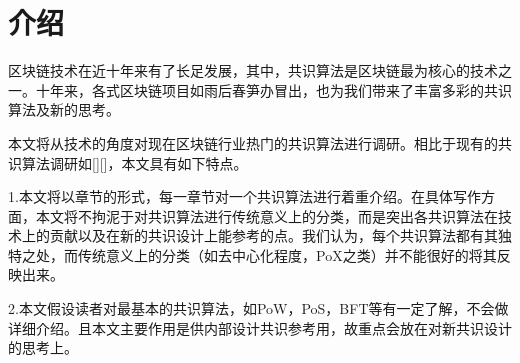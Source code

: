 \section{介绍}
区块链技术在近十年来有了长足发展，其中，共识算法是区块链最为核心的技术之一。十年来，各式区块链项目如雨后春笋办冒出，也为我们带来了丰富多彩的共识算法及新的思考。

本文将从技术的角度对现在区块链行业热门的共识算法进行调研。相比于现有的共识算法调研如[][]，本文具有如下特点。

1.本文将以章节的形式，每一章节对一个共识算法进行着重介绍。在具体写作方面，本文将不拘泥于对共识算法进行传统意义上的分类，而是突出各共识算法在技术上的贡献以及在新的共识设计上能参考的点。我们认为，每个共识算法都有其独特之处，而传统意义上的分类（如去中心化程度，PoX之类）并不能很好的将其反映出来。

2.本文假设读者对最基本的共识算法，如PoW，PoS，BFT等有一定了解，不会做详细介绍。且本文主要作用是供内部设计共识参考用，故重点会放在对新共识设计的思考上。